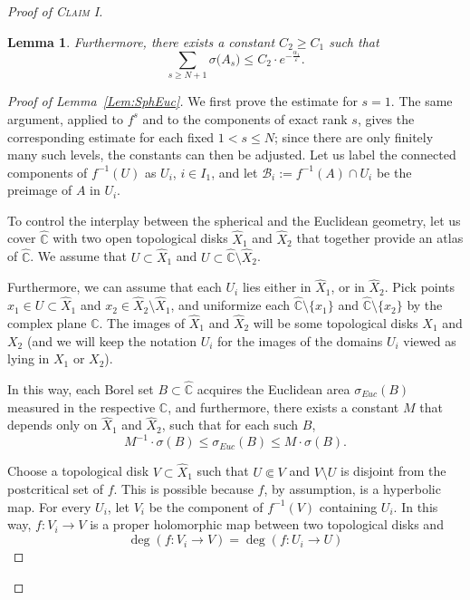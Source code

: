 \documentclass[11pt,a4paper, oneside]{amsart}
\newtheorem{lemma}[thm]{Lemma}
\theoremstyle{definition}
\theoremstyle{remark}
\numberwithin{equation}{section}
\renewcommand{\ge}{\geqslant}
\renewcommand{\le}{\leqslant}
\renewcommand{\hat}{\widehat}
\newcommand{\eps}{\varepsilon}
\newcommand{\C}{\mathbb{C}}
\newcommand{\Cc}{\widehat{{\C}}}
\newcommand{\sm}{\setminus}
\begin{document}
\begin{proof}[Proof of \textsc{Claim I}]
\begin{lemma}
    Furthermore, there exists a constant $C_2 \ge C_1$ such that
    \[
    \sum \limits_{s \ge N+1} \sigma\big( {A_s}\big) \le C_2 \cdot e^{-\frac{\alpha_1}{\eps}}.
    \]    
\end{lemma}


\begin{proof}[Proof of Lemma~\ref{Lem:SphEuc}]
	{We first prove the estimate for $s=1$. The same argument, applied to $f^s$ and to the components of exact rank $s$, gives the corresponding estimate for each fixed $1<s\le N$; since there are only finitely many such levels, the constants can then be adjusted.} Let us label the connected components of $f^{-1}(U)$ as $U_i$, $i \in I_1$, and let $\mathcal{B}_i := f^{-1}(A) \cap U_i$ be the preimage of $A$ in $U_i$.

To control the interplay between the spherical and the Euclidean geometry, let us cover $\Cc$ with two open topological disks $\hat X_1$ and $\hat X_2$ that together provide an atlas of $\Cc$. We assume that $U \subset \hat X_1$ and $U \subset \Cc \sm \hat X_2$. 

Furthermore, we can assume that each $U_i$ lies either in $\hat X_1$, or in $\hat X_2$. Pick points $x_1 \in U \subset \hat X_1$ and $x_2 \in \hat X_2 \sm \hat X_1$, and uniformize each $\Cc \sm \{x_1\}$ and $\Cc \sm \{x_2\}$ by the complex plane $\C$. The images of $\hat X_1$ and $\hat X_2$ will be some topological disks $X_1$ and $X_2$ (and we will keep the notation $U_i$ for the images of the domains $U_i$ viewed as lying in $X_1$ or $X_2$). 

In this way, each Borel set $B \subset \Cc$ acquires the Euclidean area $\sigma_{Euc}(B)$ measured in the respective $\C$, and furthermore, there exists a constant $M$ that depends only on $\hat X_1$ and $\hat X_2$, such that for each such $B$,  
\begin{equation}
\label{Eq:Comp}
M^{-1} \cdot \sigma(B) \le \sigma_{Euc}(B) \le M \cdot \sigma(B).
\end{equation}

Choose a topological disk $V \subset \hat X_1$ such that $U \Subset V$ and $V\sm U$ is disjoint from the postcritical set of $f$. This is possible because $f$, by assumption, is a hyperbolic map. For every $U_i$, let $V_i$ be the component of $f^{-1}(V)$ containing $U_i$. In this way, $f \colon V_i\to V$ is a proper holomorphic map between two topological disks and 
\[
\deg(f \colon V_i  \to V) = \deg(f \colon U_i  \to U)
\]


\end{proof}
\end{proof}
\end{document}
